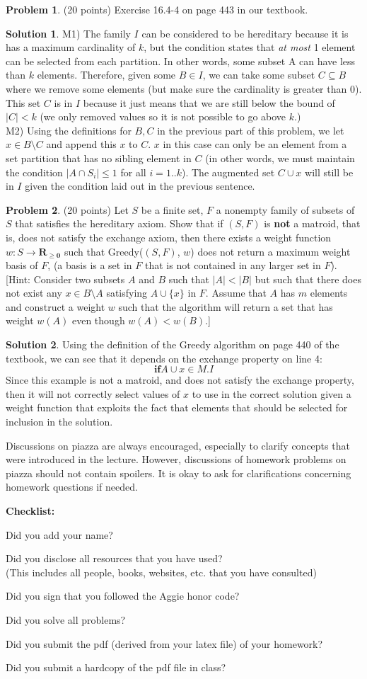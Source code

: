 \documentclass{article}
\theoremstyle{definition}
\newtheorem{problem}{Problem}
\newtheorem*{solution}{Solution}
\newcommand{\checklist}{\noindent\textbf{Checklist:}
\begin{compactitem}[$\Box$] 
\item Did you add your name? 
\item Did you disclose all resources that you have used? \\
(This includes all people, books, websites, etc. that you have consulted)
\item Did you sign that you followed the Aggie honor code? 
\item Did you solve all problems? 
\item Did you submit the pdf (derived from your latex file)
  of your homework?
\item Did you submit a hardcopy of the pdf file in class? 
\end{compactitem}
}
\begin{document}
\begin{problem}(20 points)
Exercise 16.4-4 on page 443 in our textbook. 
\end{problem}
\begin{solution}
M1) The family $I$ can be considered to be hereditary because it is has a maximum cardinality of $k$, but the condition states that \textit{at most} 1 element can be selected from each partition. In other words, some subset A can have less than $k$ elements. Therefore, given some $B \in I$, we can take some subset $C \subseteq B$ where we remove some elements (but make sure the cardinality is greater than 0). This set $C$ is in $I$ because it just means that we are still below the bound of $| C | < k$ (we only removed values so it is not possible to go above $k$.)\\
M2) Using the definitions for $B,C$ in the previous part of this problem, we let $x \in B \setminus C$ and append this $x$ to $C$. $x$ in this case can only be an element from a set partition that has no sibling element in $C$ (in other words, we must maintain the condition $| A \cap S_i | \leq 1$ for all $i = 1..k$). The augmented set $C \cup {x}$ will still be in $I$ given the condition laid out in the previous sentence.
\end{solution}

\begin{problem}(20 points)
  Let $S$ be a finite set, $F$ a nonempty family of subsets of $S$ that
  satisfies the hereditary axiom. Show that if $(S,F)$ is \textbf{not}
  a matroid, that is, does not satisfy the exchange axiom, then there
  exists a weight function $w\colon S \rightarrow \mathbf{R_{\ge 0}}$
  such that Greedy($(S,F)$, $w$) does not return a maximum weight
  basis of $F$, (a basis is a set in $F$ that is not contained in any
  larger set in $F$). [Hint: Consider two subsets $A$ and $B$ such
  that $|A|<|B|$ but such that there does not exist any $x\in
  B\setminus A$ satisfying $A\cup \{x\}$ in $F$. Assume that $A$ has
  $m$ elements and construct a weight $w$ such that the algorithm will
  return a set that has weight $w(A)$ even though $w(A)<w(B)$.]
\end{problem}
\begin{solution}
Using the definition of the Greedy algorithm on page 440 of the textbook, we can see that it depends on the exchange property on line 4: 
$$\textbf{if} A \cup {x} \in M.I$$
Since this example is not a matroid, and does not satisfy the exchange property, then it will not correctly select values of $x$ to use in the correct solution given a weight function that exploits the fact that elements that should be selected for inclusion in the solution.
\end{solution}







Discussions on piazza are always encouraged, especially to clarify
concepts that were introduced in the lecture. However, discussions of
homework problems on piazza should not contain spoilers. It is okay to
ask for clarifications concerning homework questions if needed. 
\medskip



\goodbreak
\checklist
\end{document}
